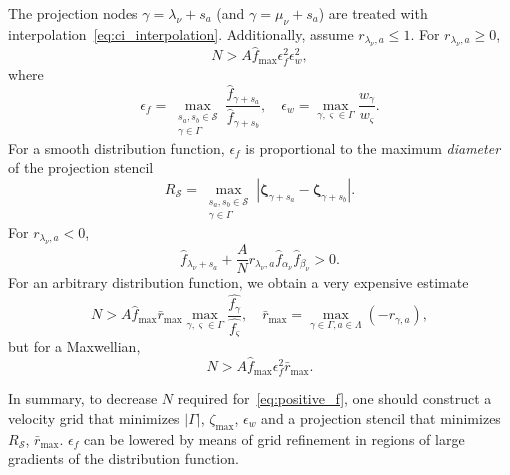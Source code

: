 \documentclass[10pt]{article}
\newcommand{\bzeta}{\boldsymbol{\zeta}}
\begin{document}
The projection nodes \(\gamma = \lambda_\nu+s_a\) (and \(\gamma = \mu_\nu+s_a\))
are treated with interpolation~\eqref{eq:ci_interpolation}.
Additionally, assume \(r_{\lambda_\nu,a} \leq 1\).
For \(r_{\lambda_\nu,a} \geq 0\),
\begin{equation}\label{eq:positive_f_lambda2+}
    N > A \hat{f}_{\max} \epsilon_f^2 \epsilon_w^2,
\end{equation}
where
\begin{equation}\label{eq:epsilon_f}
    \epsilon_f = \max_{\substack{s_a,s_b\in\mathcal{S}\\\gamma\in\Gamma}} \frac{\hat{f}_{\gamma+s_a}}{\hat{f}_{\gamma+s_b}}, \quad
    \epsilon_w = \max_{\gamma,\varsigma\in\Gamma} \frac{w_\gamma}{w_\varsigma}.
\end{equation}
For a smooth distribution function, \(\epsilon_f\) is proportional to the maximum \emph{diameter} of the projection stencil
\begin{equation}\label{eq:stencil_diameter}
    R_\mathcal{S} = \max_{\substack{s_a,s_b\in\mathcal{S}\\\gamma\in\Gamma}}
        \left| \bzeta_{\gamma+s_a} - \bzeta_{\gamma+s_b} \right|.
\end{equation}
For \(r_{\lambda_\nu,a} < 0\),
\begin{equation}\label{eq:positive_f_lambda-}
    \hat{f}_{\lambda_\nu+s_a} + \frac{A}{N}r_{\lambda_\nu,a} \hat{f}_{\alpha_\nu}\hat{f}_{\beta_\nu} > 0.
\end{equation}
For an arbitrary distribution function, we obtain a very expensive estimate
\begin{equation}\label{eq:positive_f_lambda2-}
    N > A \hat{f}_{\max} \bar{r}_{\max} \max_{\gamma,\varsigma\in\Gamma}\frac{\hat{f_\gamma}}{\hat{f_\varsigma}}, \quad
    \bar{r}_{\max} = \max_{\gamma\in\Gamma,a\in\Lambda}( -r_{\gamma,a} ),
\end{equation}
but for a Maxwellian,
\begin{equation}\label{eq:positive_f_lambda2-maxw}
    N > A \hat{f}_{\max} \epsilon_f^2 \bar{r}_{\max}.
\end{equation}

In summary, to decrease \(N\) required for~\eqref{eq:positive_f},
one should construct a velocity grid that minimizes \(|\Gamma|\), \(\zeta_{\max}\), \(\epsilon_w\)
and a projection stencil that minimizes \(R_\mathcal{S}\), \(\bar{r}_{\max}\).
\(\epsilon_f\) can be lowered by means of grid refinement in regions of large gradients of the distribution function.
\end{document}
